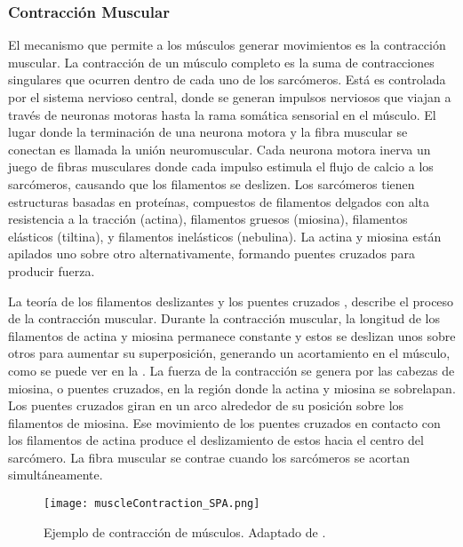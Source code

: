 \subsubsection{Contracción Muscular}

El mecanismo que permite a los músculos generar movimientos es la contracción muscular. La contracción de un músculo completo es la suma de contracciones singulares que ocurren dentro de cada uno de los sarcómeros. Está es controlada por el sistema nervioso central, donde se generan impulsos nerviosos que viajan a través de neuronas motoras hasta la rama somática sensorial en el músculo. El lugar donde la terminación de una neurona motora y la fibra muscular se conectan es llamada la unión neuromuscular. Cada neurona motora inerva un juego de fibras musculares donde cada impulso estimula el flujo de calcio a los sarcómeros, causando que los filamentos se deslizen. Los sarcómeros tienen estructuras basadas en proteínas, compuestos de filamentos delgados con alta resistencia a la tracción (actina), filamentos gruesos (miosina), filamentos elásticos (tiltina), y filamentos inelásticos (nebulina). La actina y miosina están apilados uno sobre otro alternativamente, formando puentes cruzados para producir fuerza. 

La teoría de los filamentos deslizantes y los puentes cruzados \cite{huxley1971proposed, huxley1974muscular}, describe el proceso de la contracción muscular. Durante la contracción muscular, la longitud de los filamentos de actina y miosina permanece constante y estos se deslizan unos sobre otros para aumentar su superposición, generando un acortamiento en el músculo, como se puede ver en la . La fuerza de la contracción se genera por las cabezas de miosina, o puentes cruzados, en la región donde la actina y miosina se sobrelapan. Los puentes cruzados giran en un arco alrededor de su posición sobre los filamentos de miosina. Ese movimiento de los puentes cruzados en contacto con los filamentos de actina produce el deslizamiento de estos hacia el centro del sarcómero. La fibra muscular se contrae cuando los sarcómeros se acortan simultáneamente.

\begin{figure}[!ht]
	\centering
		\texttt{[image: muscleContraction\_SPA.png]}
	\caption[Ejemplo de contracción de músculos.]{Ejemplo de contracción de músculos. Adaptado de \citep{oatis2009kynesiology}.}
	\label{fig:muscleContraction}
\end{figure}

